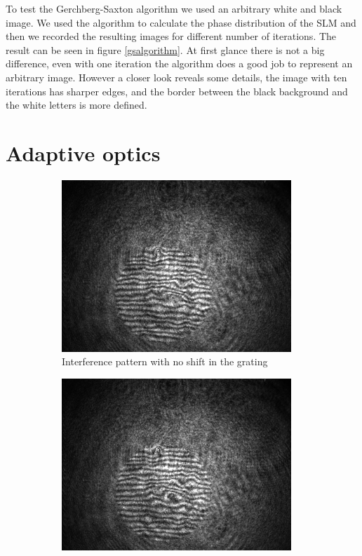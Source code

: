 \documentclass[a4paper,10pt]{article}
\begin{document}
To test the Gerchberg-Saxton algorithm we used an arbitrary white and black image. We used the algorithm to calculate the phase distribution of the SLM and then we recorded the resulting images for different number of iterations. The result can be seen in figure \ref{gsalgorithm}. At first glance there is not a big difference, even with one iteration the algorithm does a good job to represent an arbitrary image. However a closer look reveals some details, the image with ten iterations has sharper edges, and the border between the black background and the white letters is more defined.
\section{Adaptive optics}
\begin{figure}[H]
    \centering
    \begin{subfigure}[b]{0.3\textwidth}
        \includegraphics[width=\textwidth]{1pixel}
        \caption{Interference pattern with no shift in the grating}
    \end{subfigure}
    \begin{subfigure}[b]{0.3\textwidth}
        \includegraphics[width=\textwidth]{2pixel}

\end{subfigure}
\end{figure}
\end{document}
